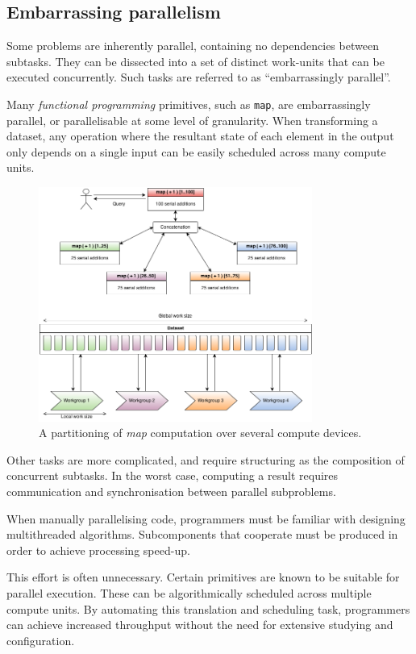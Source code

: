 \subsection{Embarrassing parallelism}
Some problems are inherently parallel, containing no dependencies between subtasks. They can be dissected into a set of distinct work-units that can be executed concurrently.
Such tasks are referred to as ``embarrassingly parallel''.

Many \emph{functional programming} primitives, such as \verb|map|, are embarrassingly parallel, or parallelisable at some level of granularity.
When transforming a dataset, any operation where the resultant state of each element in the output only depends on a single input can be easily scheduled across many compute units.

\begin{figure}[h]
  \includegraphics[width=0.8\textwidth]{./figures/map_task.png}
  \caption{A partitioning of \emph{map} computation over several compute devices.}
  \label{fig:map_task}
\end{figure}

Other tasks are more complicated, and require structuring as the composition of concurrent subtasks.
In the worst case, computing a result requires communication and synchronisation between parallel subproblems.

When manually parallelising code, programmers must be familiar with designing multithreaded algorithms. Subcomponents that cooperate must be produced in order to achieve processing speed-up.

This effort is often unnecessary. Certain primitives are known to be suitable for parallel execution. These can be algorithmically scheduled across multiple compute units. By automating this translation and scheduling task, programmers can achieve increased throughput without the need for extensive studying and configuration.

